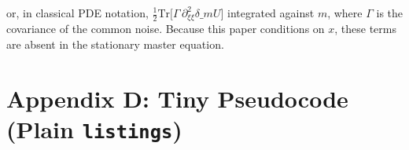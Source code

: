 \documentclass[11pt,letterpaper,oneside]{article}
\numberwithin{equation}{section}
\newcommand{\1}{\mathbf{1}}
\newcommand{\dmU}{\delta\_m U}
\begin{document}
or, in classical PDE notation,
$\tfrac12 \mathrm{Tr}\big[\Gamma\,\partial_{\xi\xi}^2 \dmU\big]$
integrated against $m$, where $\Gamma$ is the covariance of the common noise. Because this paper conditions on $x$, these terms are absent in the stationary master equation.

\section{Appendix D: Tiny Pseudocode (Plain \texorpdfstring{\texttt{listings}}{listings})}\label{app:code}

\lstset{
basicstyle=\ttfamily\small,
columns=fullflexible,
showstringspaces=false,
frame=single,
framerule=0.4pt,
breaklines=true,
tabsize=2,
captionpos=b
}
\end{document}
